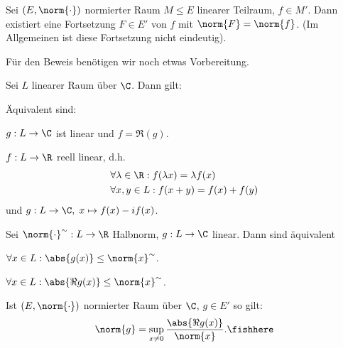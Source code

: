 \begin{prop}
\label{prop:4.10}
Sei $(E,\norm{\cdot})$ normierter Raum $M\le E$ linearer Teilraum, $f\in M'$.
Dann existiert eine Fortsetzung $F\in E'$ von $f$ mit $\norm{F}=\norm{f}$. (Im
Allgemeinen ist diese Fortsetzung nicht eindeutig).\fishhere
\end{prop}

Für den Beweis benötigen wir noch etwas Vorbereitung.

\begin{lem}
\label{lem:4.11}
Sei $L$ linearer Raum über $\C$. Dann gilt:
\begin{propenum}
  \item\label{lem:4.11:1} Äquivalent sind:
  \begin{equivenum}
    \item $g: L\to \C$ ist linear und $f=\Re(g)$.
    \item $f:L\to\R$ reell linear, d.h.
\begin{align*}
&\forall \lambda \in\R : f(\lambda x) = \lambda f(x)\\
&\forall x,y\in L: f(x+y) = f(x)+f(y)
\end{align*}
und $g:L\to \C,\; x\mapsto f(x)-if(x)$.
  \end{equivenum}
  \item\label{lem:4.11:2} Sei $\norm{\cdot}^\sim : L\to\R$ Halbnorm, $g:
  L\to\C$ linear. Dann sind äquivalent
\begin{equivenum}
  \item $\forall x\in L : \abs{g(x)}\le \norm{x}^\sim$.
  \item $\forall x\in L : \abs{\Re g(x)} \le \norm{x}^\sim$.
\end{equivenum}
\item\label{lem:4.11:3} Ist $(E,\norm{\cdot})$ normierter Raum über $\C$, $g\in
E'$ so gilt:
\begin{align*}
\norm{g} = \sup\limits_{x\neq 0} \frac{\abs{\Re g(x)}}{\norm{x}}.\fishhere
\end{align*}
\end{propenum}
\end{lem}

